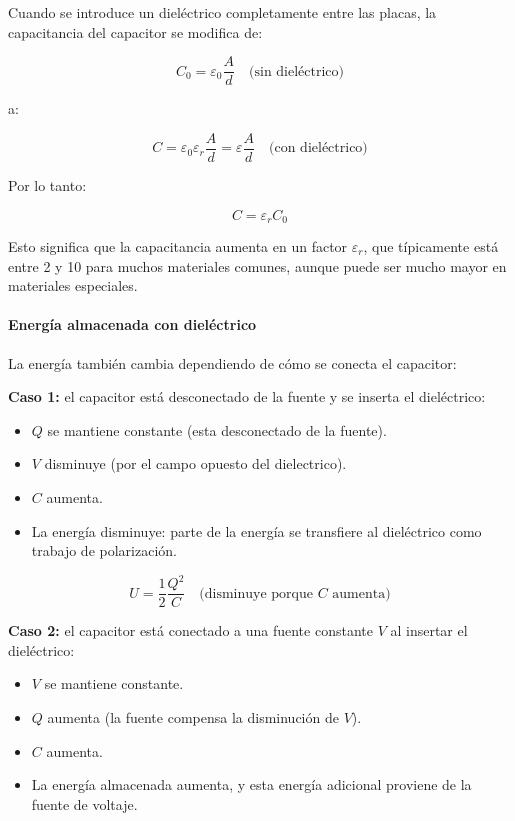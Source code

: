 Cuando se introduce un dieléctrico completamente entre las placas, la capacitancia del capacitor se modifica de:

\[
C_0 = \varepsilon_0 \frac{A}{d}
\quad \text{(sin dieléctrico)}
\]

a:

\[
C = \varepsilon_0 \varepsilon_r \frac{A}{d} = \varepsilon \frac{A}{d}
\quad \text{(con dieléctrico)}
\]

Por lo tanto:

\begin{equation}
    \boxed{C = \varepsilon_r C_0}
    \label{eq:capacitance_dielectric}
\end{equation}

Esto significa que la capacitancia aumenta en un factor \( \varepsilon_r \), que típicamente está entre 2 y 10 para muchos materiales comunes, aunque puede ser mucho mayor en materiales especiales.

\paragraph{Energía almacenada con dieléctrico}

La energía también cambia dependiendo de cómo se conecta el capacitor:

\textbf{Caso 1: } el capacitor está desconectado de la fuente y se inserta el dieléctrico:
\begin{itemize}
    \item \( Q \) se mantiene constante (esta desconectado de la fuente).
    \item \( V \) disminuye (por el campo opuesto del dielectrico).
    \item \( C \) aumenta.
    \item La energía disminuye: parte de la energía se transfiere al dieléctrico como trabajo de polarización.
\end{itemize}

\[
U = \frac{1}{2} \frac{Q^2}{C} \quad \text{(disminuye porque } C \text{ aumenta)}
\]

\textbf{Caso 2: } el capacitor está conectado a una fuente constante \( V \) al insertar el dieléctrico:
\begin{itemize}
    \item \( V \) se mantiene constante.
    \item \( Q \) aumenta (la fuente compensa la disminución de \( V \)).
    \item \( C \) aumenta.
    \item La energía almacenada aumenta, y esta energía adicional proviene de la fuente de voltaje.
\end{itemize}

